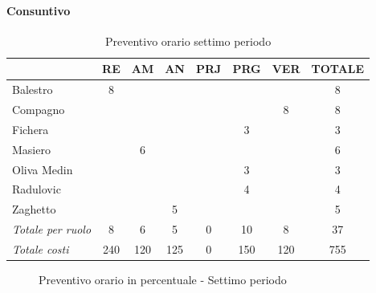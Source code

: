 \documentclass[a4paper,12pt]{article}
\begin{document}
            \paragraph{Consuntivo}
                \begin{table}[H]
                \centering
                \caption{Preventivo orario settimo periodo}
                \begin{tabular}{|l|c|c|c|c|c|c|c|}
                \hline
                    \rowcolor{lightgray}{\textbf{Membro}} & {\textbf{RE}} & {\textbf{AM}} & {\textbf{AN}} & {\textbf{PRJ}} & {\textbf{PRG}} & {\textbf{VER}} & {\textbf{TOTALE}}\\
                \hline
                    Balestro & 8 & & & & & & 8\\
                \hline
                    Compagno & & & & & & 8 & 8\\
                \hline
                    Fichera & & & & & 3 & & 3\\
                \hline
                    Masiero & & 6 & & & & & 6\\
                \hline
                    Oliva Medin & & & & & 3 & & 3\\
                \hline
                    Radulovic & & & & & 4 & & 4\\
                \hline
                    Zaghetto & & & 5 & & & & 5\\
                \hline
                    \rowcolor{lightgray}\textit{Totale per ruolo} & 8 & 6 & 5 & 0 & 10 & 8 & 37\\
                \hline
                    \rowcolor{lightgray}\textit{Totale costi} & 240 & 120 & 125 & 0 & 150 & 120 & 755\\
                \hline
                \end{tabular}
                \end{table}

                \begin{figure}[H]
                \centering
                \caption{Preventivo orario in percentuale - Settimo periodo}
                \end{figure}
                
\end{document}
